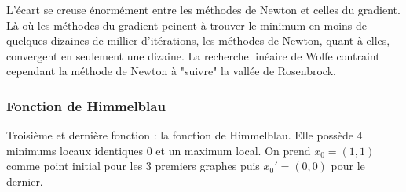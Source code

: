 \documentclass[a4paper,10pt]{article}
\begin{document}
\begin{figure}[H]
	\centering
\end{figure}

L'écart se creuse énormément entre les méthodes de Newton et celles du gradient. Là où les méthodes du gradient peinent à trouver le minimum en moins de quelques dizaines de millier d'itérations, les méthodes de Newton, quant à elles, convergent en seulement une dizaine. La recherche linéaire de Wolfe contraint cependant la méthode de Newton à "suivre" la vallée de Rosenbrock.

\newpage
\subsubsection{Fonction de Himmelblau}

\hspace{0.4cm}
Troisième et dernière fonction : la fonction de Himmelblau.
Elle possède 4 minimums locaux identiques 0 et un maximum local.
On prend $x_0 = (1,1)$ comme point initial pour les 3 premiers graphes puis $x_0' = (0,0)$ pour le dernier.
\end{document}
